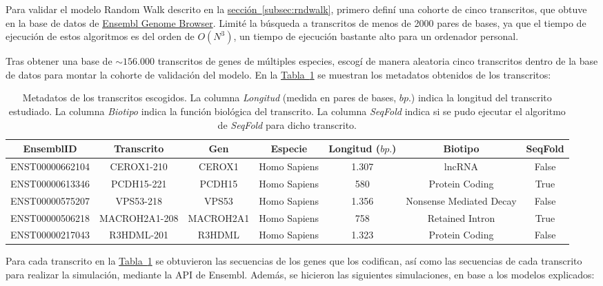 \documentclass[a4paper,11pt,titlepage]{article}
\newcommand{\nr}[2][sección]{\hyperref[#2]{#1~\ref{#2}}}
\theoremstyle{definition}
\begin{document}
Para validar el modelo Random Walk descrito en la \nr[sección]{subsec:rndwalk}, primero definí una cohorte de cinco transcritos, que obtuve en la base de datos de \href{https://www.ensembl.org/index.html}{Ensembl Genome Browser}. Limité la búsqueda a transcritos de menos de 2000 pares de bases, ya que el tiempo de ejecución de estos algoritmos es del orden de $O(N^3)$, un tiempo de ejecución bastante alto para un ordenador personal.

Tras obtener una base de $\sim156.000$ transcritos de genes de múltiples especies, escogí de manera aleatoria cinco transcritos dentro de la base de datos para montar la cohorte de validación del modelo. En la \nr[Tabla]{tab:transcripts} se muestran los metadatos obtenidos de los transcritos:

\begin{table}[H]
	\centering
    \begin{adjustbox}{width=\textwidth}
	\begin{tabular}{ccccccc}
	    \toprule
        EnsemblID & Transcrito & Gen & Especie & Longitud ($bp.$) & Biotipo & SeqFold \\
		\midrule
        ENST00000662104 & CEROX1-210 & CEROX1 & Homo Sapiens & 1.307 & lncRNA & False \\
        ENST00000613346 & PCDH15-221 & PCDH15 & Homo Sapiens & 580 & Protein Coding  & True \\
        ENST00000575207 & VPS53-218 & VPS53 & Homo Sapiens & 1.356 & Nonsense Mediated Decay & False \\
        ENST00000506218 & MACROH2A1-208 & MACROH2A1 & Homo Sapiens & 758 & Retained Intron & True \\
        ENST00000217043 & R3HDML-201 & R3HDML & Homo Sapiens & 1.323 & Protein Coding & False \\
		\bottomrule
	\end{tabular}
    \end{adjustbox}
	\small{\caption{Metadatos de los transcritos escogidos. La columna \textit{Longitud} (medida en pares de bases, $bp.$) indica la longitud del transcrito estudiado. La columna \textit{Biotipo} indica la función biológica del transcrito. La columna \textit{SeqFold} indica si se pudo ejecutar el algoritmo de \textit{SeqFold} para dicho transcrito.}}\normalsize
    \label{tab:transcripts}
\end{table}

Para cada transcrito en la \nr[Tabla]{tab:transcripts} se obtuvieron las secuencias de los genes que los codifican, así como las secuencias de cada transcrito para realizar la simulación, mediante la API de Ensembl. Además, se hicieron las siguientes simulaciones, en base a los modelos explicados: 
\end{document}
